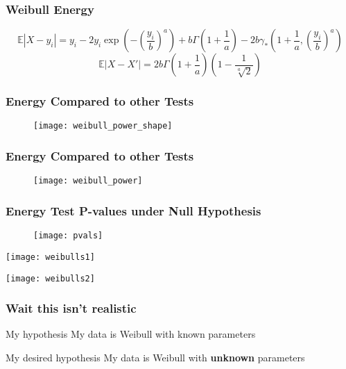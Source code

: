\documentclass[presentation]{beamer}
\begin{document}
\begin{frame}
  \frametitle{Weibull Energy}
  \begin{displaymath}
    \mathbb{E}|X-y_i| = y_i - 2y_i \exp\left( - \left(\frac{y_i}{b}\right)^a \right) + b
    \Gamma \left(1 + \frac{1}{a}\right) -2b \gamma_{*} \left(1 + \frac{1}{a}, \left( \frac{y_i}{b} \right)^a\right)
  \end{displaymath}
  \vskip 0.5in
  \begin{displaymath}
    \mathbb{E}|X - X'| = 2b\Gamma \left( 1 + \frac{1}{a} \right)
    \left( 1 - \frac{1}{\sqrt[a]{2}} \right)
  \end{displaymath}
\end{frame}

\begin{frame}
  \frametitle{Energy Compared to other Tests}
  \begin{figure}
    \centering
    \texttt{[image: weibull\_power\_shape]}
  \end{figure}
\end{frame}

\begin{frame}
  \frametitle{Energy Compared to other Tests}
  \begin{figure}
    \centering
    \texttt{[image: weibull\_power]}
  \end{figure}
\end{frame}

\begin{frame}
  \frametitle{Energy Test P-values under Null Hypothesis}
  \begin{figure}
    \centering
    \texttt{[image: pvals]}
  \end{figure}
\end{frame}


\begin{frame}
 \texttt{[image: weibulls1]} 
\end{frame}


\begin{frame}
 \texttt{[image: weibulls2]} 
\end{frame}

\begin{frame}
  \frametitle{Wait this isn't realistic}
  \begin{block}{My hypothesis}
    My data is Weibull with known parameters
  \end{block}

  \begin{block}{My desired hypothesis}
    My data is Weibull with \textbf{unknown} parameters
  \end{block}
\end{frame}
\end{document}

